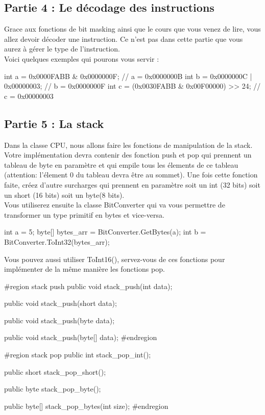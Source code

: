 \subsection{Partie 4 : Le décodage des instructions}

Grace aux fonctions de bit masking ainsi que le cours que vous venez de lire,
vous allez devoir décoder une instruction.  Ce n'est pas dans cette partie que
vous aurez à gérer le type de l'instruction.\\

Voici quelques exemples qui pourons vous servir :
\begin{code} 
  int a = 0x0000FABB & 0x0000000F;
  // a = 0x0000000B
  int b = 0x0000000C | 0x00000003;
  // b = 0x0000000F
  int c = (0x0030FABB & 0x00F00000) >> 24;
  // c = 0x00000003
\end{code}


\subsection{Partie 5 : La stack}
Dans la classe CPU, nous allons faire les
fonctions de manipulation de la stack. Votre implémentation devra contenir des
fonction push et pop qui prennent un tableau de byte en paramètre et qui empile
tous les élements de ce tableau (attention: l'élement 0 du tableau devra être au
sommet).  Une fois cette fonction faite, créez d'autre surcharges qui prennent
en paramètre soit un int (32 bits) soit un short (16 bits) soit un byte(8 bits).
\\ Vous utiliserez ensuite la classe BitConverter qui va vous permettre de
transformer un type primitif en bytes et vice-versa.
\begin{code}
  int a = 5;
  byte[] bytes_arr = BitConverter.GetBytes(a);
  int b =
  BitConverter.ToInt32(bytes_arr);
\end{code}
Vous pouvez aussi utiliser ToInt16(), servez-vous de ces fonctions pour 
implémenter de la même manière les fonctions pop.
\begin{code}
  #region stack push
        public void stack_push(int data);

        public void stack_push(short data);

        public void stack_push(byte data);

        public void stack_push(byte[] data); #endregion

  #region stack pop
        public int stack_pop_int();
        
        public short stack_pop_short();
        
        public byte stack_pop_byte();
        
        public byte[] stack_pop_bytes(int size);
  #endregion
\end{code}


